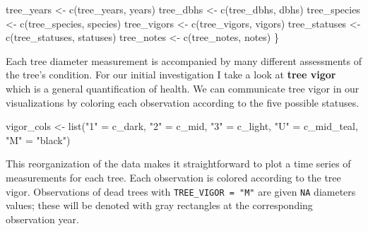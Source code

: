 \documentclass[
  letterpaper,
  DIV=11,
  numbers=noendperiod]{scrartcl}
\newenvironment{Shaded}{\begin{snugshade}}{\end{snugshade}}
\newcommand{\FunctionTok}[1]{\textcolor[rgb]{0.28,0.35,0.67}{#1}}
\newcommand{\NormalTok}[1]{\textcolor[rgb]{0.00,0.23,0.31}{#1}}
\newcommand{\OtherTok}[1]{\textcolor[rgb]{0.00,0.23,0.31}{#1}}
\newcommand{\StringTok}[1]{\textcolor[rgb]{0.13,0.47,0.30}{#1}}
\begin{document}
\begin{Shaded}
\begin{Highlighting}[]
\NormalTok{  tree\_years }\OtherTok{\textless{}{-}} \FunctionTok{c}\NormalTok{(tree\_years, years)}
\NormalTok{  tree\_dbhs }\OtherTok{\textless{}{-}} \FunctionTok{c}\NormalTok{(tree\_dbhs, dbhs)}
\NormalTok{  tree\_species }\OtherTok{\textless{}{-}} \FunctionTok{c}\NormalTok{(tree\_species, species)}
\NormalTok{  tree\_vigors }\OtherTok{\textless{}{-}} \FunctionTok{c}\NormalTok{(tree\_vigors, vigors)}
\NormalTok{  tree\_statuses }\OtherTok{\textless{}{-}} \FunctionTok{c}\NormalTok{(tree\_statuses, statuses)}
\NormalTok{  tree\_notes }\OtherTok{\textless{}{-}} \FunctionTok{c}\NormalTok{(tree\_notes, notes)}
\NormalTok{\}}
\end{Highlighting}
\end{Shaded}

Each tree diameter measurement is accompanied by many different
assessments of the tree's condition. For our initial investigation I
take a look at \textbf{tree vigor} which is a general quantification of
health. We can communicate tree vigor in our visualizations by coloring
each observation according to the five possible statuses.

\begin{Shaded}
\begin{Highlighting}[]
\NormalTok{vigor\_cols }\OtherTok{\textless{}{-}} \FunctionTok{list}\NormalTok{(}\StringTok{"1"} \OtherTok{=}\NormalTok{ c\_dark, }\StringTok{"2"} \OtherTok{=}\NormalTok{ c\_mid, }\StringTok{"3"} \OtherTok{=}\NormalTok{ c\_light,}
                   \StringTok{"U"} \OtherTok{=}\NormalTok{ c\_mid\_teal, }\StringTok{"M"} \OtherTok{=} \StringTok{"black"}\NormalTok{)}
\end{Highlighting}
\end{Shaded}

This reorganization of the data makes it straightforward to plot a time
series of measurements for each tree. Each observation is colored
according to the tree vigor. Observations of dead trees with
\texttt{TREE\_VIGOR\ =\ "M"} are given \texttt{NA} diameters values;
these will be denoted with gray rectangles at the corresponding
observation year.
\end{document}
